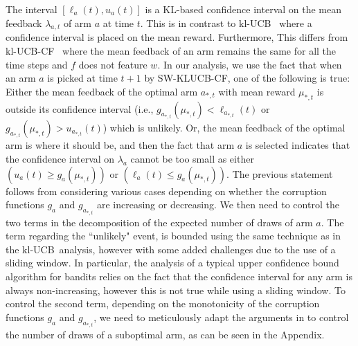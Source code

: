 \documentclass[letterpaper]{article} %
\newcommand{\KLUCBCF}{$\mathrm{kl}$-\textsc{UCB-CF}}
\newcommand{\SWKLUCBCF}{\textsc{SW-KLUCB-CF}}
\newcommand{\KLUCB}{$\mathrm{kl}$-\textsc{UCB}}
\newcommand{\optArm}[1]{a_{*, #1}}
\newcommand{\optMean}[1]{\mu_{*, #1}}
\newcommand{\meanFeedback}[2]{\lambda_{#1, #2}}
\newcommand{\windowsize}{w}
\begin{document}
\vspace{-2.88mm}  The interval $[\ell_a(t), u_a(t)]$ is a KL-based confidence interval on the mean feedback $\meanFeedback{a}{t}$ of arm $a$ at time $t$.
This is in contrast to \KLUCB\ \citep{KLUCBJournal} where a confidence interval is placed on the mean reward. Furthermore,
This differs from \KLUCBCF \ \cite{pmlr-v83-gajane18a} where the mean feedback of an arm remains the same for all the time steps and $f$ does not feature $\windowsize$.  In our analysis, we use the fact that when an arm $a$ is picked at time $t+1$ by \SWKLUCBCF, one of the following is true:
Either the mean feedback of the optimal arm $\optArm{t}$ with mean reward $\optMean{t}$ is outside its confidence interval (i.e., $g_{\optArm{t}}(\optMean{t}) < \ell_{\optArm{t}}(t)$ or $g_{\optArm{t}}(\optMean{t}) > u_{\optArm{t}}(t)$) which is unlikely. Or,
the mean feedback of the optimal arm is where it should be, and then the fact that arm $a$ is selected indicates that the confidence interval on $\lambda_a$ cannot be too small as either $(u_a(t) \geq g_a(\optMean{t}))$ or $(\ell_a(t) \leq g_a(\optMean{t}))$.
The previous statement follows from considering various cases depending on whether the corruption functions $g_a$ and $g_{\optArm{t}}$ are increasing or decreasing.
We then need to control the two terms in the decomposition of the expected number of draws of arm $a$. The term regarding the ``unlikely" event, is bounded using the same technique as in the \KLUCB \ analysis, however with some added challenges due to the use of a sliding window. In particular, the analysis of a typical upper confidence bound algorithm for bandits relies on the fact that the confidence interval for any arm is always non-increasing, however this is not true while using a sliding window. To control the second term, depending on the monotonicity of the corruption functions $g_a$ and $g_{\optArm{t}}$, we need to meticulously adapt the arguments in \citet{KLUCBJournal} to control the number of draws of a suboptimal arm, as can be seen in the Appendix.

\vspace{-2.51mm}
\end{document}
